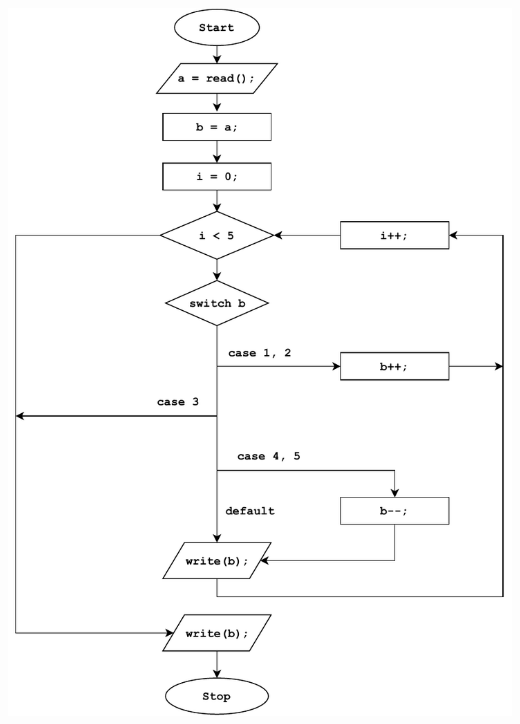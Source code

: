 \documentclass[11pt]{exam} %
\begin{document}
\begin{questions}
\begin{solution}
\includegraphics[width=\linewidth]{kontrollfluss.pdf}
\end{solution}

\end{questions}
\end{document}
